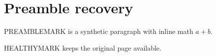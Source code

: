 \documentclass{article}
\begin{document}
\section{Preamble recovery}
PREAMBLEMARK is a synthetic paragraph with inline math $a+b$.

HEALTHYMARK keeps the original page available.
\end{document}

